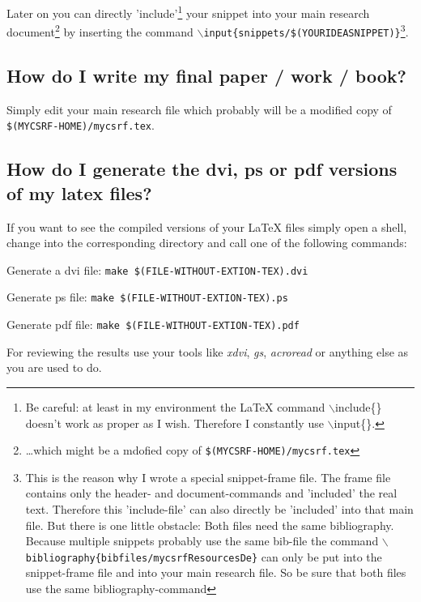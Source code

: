 \documentclass[DIV=calc,BCOR=5mm,11pt,headings=small,oneside,abstract=true, toc=bib]{scrartcl}
\begin{document}
Later on you can directly 'include'\footnote{Be careful: at least in my
environment the LaTeX command $\backslash$include\{\} doesn't work as proper as
I wish. Therefore I constantly use $\backslash$input\{\}.} your snippet into
your main research document\footnote{\ldots which might be a mdofied copy of
\texttt{\$(MYCSRF-HOME)/mycsrf.tex}} by inserting the command
\texttt{$\backslash$input\{snippets/\$(YOURIDEASNIPPET)\}}\footnote{This is the
reason why I wrote a special snippet-frame file. The frame file contains only
the header- and document-commands and 'included' the real text. Therefore this
'include-file' can also directly be 'included' into that main file. But there is
one little obstacle: Both files need the same bibliography. Because multiple
snippets probably use the same bib-file the command
\texttt{$\backslash$bibliography\{\-bibfiles/\-mycsrfResourcesDe\}} can only be
put into the snippet-frame file and into your main research file. So be sure
that both files use the same bibliography-command}.

\subsection{How do I write my final paper / work / book?}

Simply edit your main research file which probably will be a modified copy of
\texttt{\$(MYCSRF-HOME)/mycsrf.tex}. 

\subsection{How do I generate the dvi, ps or pdf versions of my latex files?}
If you want to see the compiled versions of your LaTeX files simply open a
shell, change into the corresponding directory and call one of the following
commands:

\begin{description} 
\item Generate a dvi file: \texttt{make \$(FILE-WITHOUT-EXTION-TEX).dvi}
\item Generate ps file: \texttt{make \$(FILE-WITHOUT-EXTION-TEX).ps} 
\item Generate pdf file: \texttt{make \$(FILE-WITHOUT-EXTION-TEX).pdf}
\end{description}

For reviewing the results use your tools like \textit{xdvi}, \textit{gs},
\textit{acroread} or anything else as you are used to do.
\end{document}
